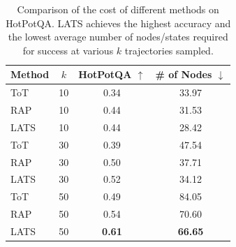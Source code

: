 \begin{table}[t]
\centering
\begin{tabular}{l|ccc}
\toprule
Method & $k$ & HotPotQA $\uparrow$ & \# of Nodes $\downarrow$ \\
\midrule
ToT & 10 & 0.34 & 33.97 \\
RAP & 10 & 0.44 & 31.53 \\
LATS & 10 & 0.44 & 28.42 \\
\midrule
ToT & 30 & 0.39 & 47.54 \\
RAP & 30 & 0.50 & 37.71 \\
LATS & 30 & 0.52 & 34.12 \\
\midrule
ToT & 50 & 0.49 & 84.05 \\
RAP & 50 & 0.54 & 70.60 \\
LATS & 50 & \textbf{0.61} & \textbf{66.65} \\
\bottomrule
\end{tabular}
\caption{Comparison of the cost of different methods on HotPotQA. LATS achieves the highest accuracy and the lowest average number of nodes/states required for success at various $k$ trajectories sampled.}
\vspace{-0.1in}
\label{table:costk}
\end{table}